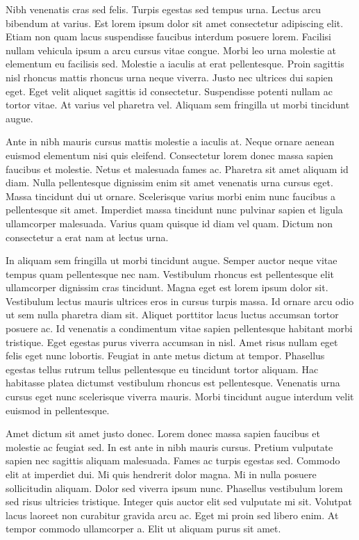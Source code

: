 \documentclass[11pt,a4paper]{article}
\begin{document}
Nibh venenatis cras sed felis. Turpis egestas sed tempus urna. Lectus arcu bibendum at varius. Est lorem ipsum dolor sit amet consectetur adipiscing elit. Etiam non quam lacus suspendisse faucibus interdum posuere lorem. Facilisi nullam vehicula ipsum a arcu cursus vitae congue. Morbi leo urna molestie at elementum eu facilisis sed. Molestie a iaculis at erat pellentesque. Proin sagittis nisl rhoncus mattis rhoncus urna neque viverra. Justo nec ultrices dui sapien eget. Eget velit aliquet sagittis id consectetur. Suspendisse potenti nullam ac tortor vitae. At varius vel pharetra vel. Aliquam sem fringilla ut morbi tincidunt augue.

Ante in nibh mauris cursus mattis molestie a iaculis at. Neque ornare aenean euismod elementum nisi quis eleifend. Consectetur lorem donec massa sapien faucibus et molestie. Netus et malesuada fames ac. Pharetra sit amet aliquam id diam. Nulla pellentesque dignissim enim sit amet venenatis urna cursus eget. Massa tincidunt dui ut ornare. Scelerisque varius morbi enim nunc faucibus a pellentesque sit amet. Imperdiet massa tincidunt nunc pulvinar sapien et ligula ullamcorper malesuada. Varius quam quisque id diam vel quam. Dictum non consectetur a erat nam at lectus urna.

In aliquam sem fringilla ut morbi tincidunt augue. Semper auctor neque vitae tempus quam pellentesque nec nam. Vestibulum rhoncus est pellentesque elit ullamcorper dignissim cras tincidunt. Magna eget est lorem ipsum dolor sit. Vestibulum lectus mauris ultrices eros in cursus turpis massa. Id ornare arcu odio ut sem nulla pharetra diam sit. Aliquet porttitor lacus luctus accumsan tortor posuere ac. Id venenatis a condimentum vitae sapien pellentesque habitant morbi tristique. Eget egestas purus viverra accumsan in nisl. Amet risus nullam eget felis eget nunc lobortis. Feugiat in ante metus dictum at tempor. Phasellus egestas tellus rutrum tellus pellentesque eu tincidunt tortor aliquam. Hac habitasse platea dictumst vestibulum rhoncus est pellentesque. Venenatis urna cursus eget nunc scelerisque viverra mauris. Morbi tincidunt augue interdum velit euismod in pellentesque.

Amet dictum sit amet justo donec. Lorem donec massa sapien faucibus et molestie ac feugiat sed. In est ante in nibh mauris cursus. Pretium vulputate sapien nec sagittis aliquam malesuada. Fames ac turpis egestas sed. Commodo elit at imperdiet dui. Mi quis hendrerit dolor magna. Mi in nulla posuere sollicitudin aliquam. Dolor sed viverra ipsum nunc. Phasellus vestibulum lorem sed risus ultricies tristique. Integer quis auctor elit sed vulputate mi sit. Volutpat lacus laoreet non curabitur gravida arcu ac. Eget mi proin sed libero enim. At tempor commodo ullamcorper a. Elit ut aliquam purus sit amet.
\end{document}
